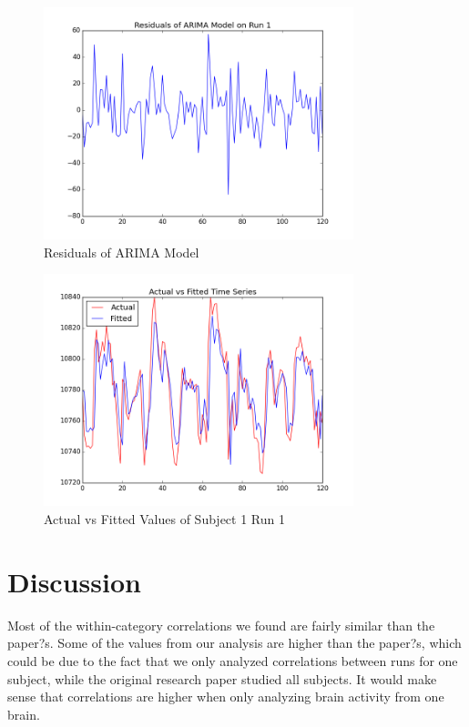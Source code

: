 \documentclass[11pt,twocolumn]{article}
\begin{document}
\begin{figure}[h!]                                                              
\centering                                                                      
\includegraphics[width=90mm]{sub001_run001_residFit.png}                   
\caption{Residuals of ARIMA Model}                                    
\end{figure}

\begin{figure}[h!]                                                              
\centering                                                                      
\includegraphics[width=90mm]{AFTS.png}                   
\caption{Actual vs Fitted Values of Subject 1 Run 1}                                    
\end{figure}


\section{Discussion}

Most of the within-category correlations we found are fairly similar than the paper?s. 
Some of the values from our analysis are higher than the paper?s, which could be 
due to the fact that we only analyzed correlations between runs for one subject, 
while the original research paper studied all subjects. It would make sense that 
correlations are higher when only analyzing brain activity from one brain. \\
\end{document}

